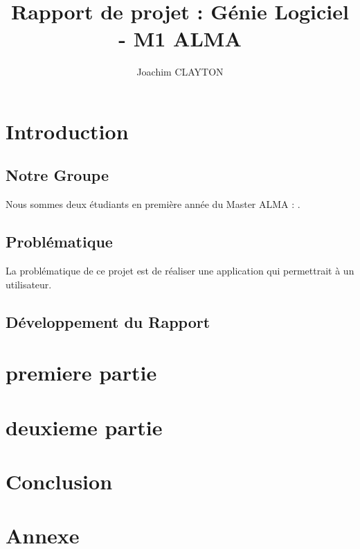 \documentclass[a4paper 14pt]{article}
\title{Rapport de projet : Génie Logiciel - M1 ALMA}
\author{Joachim CLAYTON}
\begin{document}
\maketitle
\date




\newpage
\renewcommand{\contentsname}{Sommaire} 
\tableofcontents
\newpage


\section{Introduction}
\vspace{1cm}


\subsection{Notre Groupe}

Nous sommes deux étudiants en première année du Master ALMA : .


\subsection{Problématique}

La problématique de ce projet est de réaliser une application qui permettrait à un utilisateur.


\subsection{Développement du Rapport}


\newpage
\section{premiere partie}




\section{deuxieme partie}

\section{Conclusion}

\section{Annexe}
\end{document}
